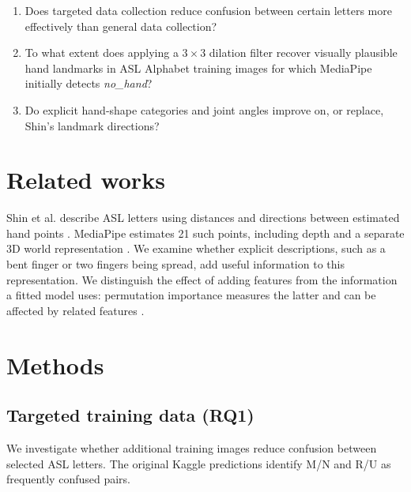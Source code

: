 \documentclass{article}
\begin{document}
\begin{enumerate}
    \item Does targeted data collection reduce confusion between certain letters more effectively than general data collection?
    \item To what extent does applying a \(3 \times 3\) dilation filter recover visually plausible hand landmarks in ASL Alphabet training images for which MediaPipe initially detects \textit{no\_hand}?
    \item Do explicit hand-shape categories and joint angles improve on, or replace, Shin's landmark directions?
\end{enumerate}

\section{Related works}

Shin et al. describe ASL letters using distances and directions between estimated hand points \citep{ton-shin2021}. MediaPipe estimates 21 such points, including depth and a separate 3D world representation \citep{ton-zhang2020}. We examine whether explicit descriptions, such as a bent finger or two fingers being spread, add useful information to this representation. We distinguish the effect of adding features from the information a fitted model uses: permutation importance measures the latter and can be affected by related features \citep{ton-fisher2019}.

\section{Methods}

\subsection{Targeted training data (RQ1)}
We investigate whether additional training images reduce confusion between selected ASL letters. The original Kaggle predictions identify M/N and R/U as frequently confused pairs.
\end{document}
